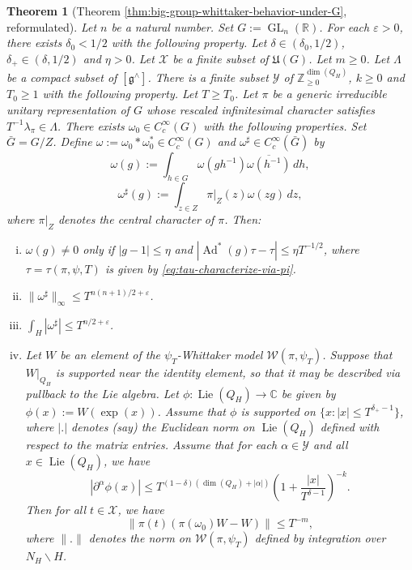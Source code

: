 \documentclass[reqno]{amsart}
\DeclareMathOperator{\GL}{GL}
\DeclareMathOperator{\Ad}{Ad}
\def\eps{\varepsilon}
\DeclareMathOperator{\Lie}{Lie}
\theoremstyle{plain} \newtheorem{theorem} {Theorem}
\theoremstyle{definition} \newtheorem{definition} [theorem] {Definition}
\theoremstyle{itplain} %
\numberwithin{equation}{section}
\numberwithin{theorem}{section}
\renewcommand{\geq}{\geqslant}
\renewcommand{\leq}{\leqslant}
\begin{document}
\begin{theorem}[Theorem \ref{thm:big-group-whittaker-behavior-under-G}, reformulated]
  Let $n$ be a natural number.  Set $G := \GL_n(\mathbb{R})$.  For each $\eps > 0$, there exists $\delta _0 < 1/2$ with the following property.  Let $\delta \in (\delta_0, 1/2)$, $\delta_+ \in (\delta, 1/2)$ and $\eta > 0$.  Let $\mathcal{X}$ be a finite subset of $\mathfrak{U}(G)$.  Let $m \geq 0$.  Let $\Lambda$ be a compact subset of $[\mathfrak{g}^\wedge]$.  There is a finite subset $\mathcal{Y}$ of $\mathbb{Z}_{\geq 0}^{\dim(Q_H)}$, $k \geq 0$ and $T_0 \geq 1$ with the following property.  Let $T \geq T_0$.  Let $\pi$ be a generic irreducible unitary representation of $G$ whose rescaled infinitesimal character satisfies $T^{-1} \lambda_\pi \in \Lambda$.  There exists $\omega_0 \in C_c^\infty(G)$ with the following properties.  Set $\bar{G} = G/Z$.  Define $\omega := \omega_0 \ast \omega_0^\ast \in C_c^\infty(G)$ and $\omega^\sharp \in C_c^\infty(\bar{G})$ by
  \begin{equation*}
    \omega(g) := \int _{h \in G} \omega(g h^{-1}) \overline{\omega(h^{-1})} \, d h,
  \end{equation*}
  \begin{equation*}
    \omega^\sharp (g) := \int _{z \in Z}
    \pi|_Z (z) \omega(z g) \, d z,
  \end{equation*}
  where $\pi|_Z$ denotes the central character of $\pi$.  Then:
  \begin{enumerate}[(i)]
  \item  $\omega(g) \neq 0$ only if $|g -1| \leq \eta$ and $|\Ad^*(g) \tau - \tau| \leq \eta T^{-1/2}$, where $\tau = \tau(\pi,\psi,T)$ is given by \eqref{eq:tau-characterize-via-pi}.
  \item $\|\omega^\sharp\|_{\infty} \leq T^{n(n+1)/2+\eps}$.
  \item $\int_H |\omega^\sharp| \leq T^{n/2 + \eps}$.
  \item Let $W$ be an element of the $\psi_T$-Whittaker model $\mathcal{W}(\pi,\psi_T)$.  Suppose that $W|_{Q_H}$ is supported near the identity element, so that it may be described via pullback to the Lie algebra.  Let $\phi : \Lie(Q_H) \rightarrow \mathbb{C}$ be given by $\phi(x) := W(\exp(x))$.  Assume that $\phi$ is supported on $\{x : |x| \leq T^{\delta_+ - 1}\}$, where $|.|$ denotes (say) the Euclidean norm on $\Lie(Q_H)$ defined with respect to the matrix entries.  Assume that for each $\alpha \in \mathcal{Y}$ and all $x \in \Lie(Q_H)$, we have
    \begin{equation*}
      \left\lvert \partial^\alpha \phi(x) \right\rvert \leq T^{(1 - \delta) (\dim(Q_H) + |\alpha|)} \left( 1 + \frac{|x|}{T^{\delta-1}} \right)^{-k}.
    \end{equation*}
    Then for all $t\in \mathcal{X}$, we have
    \begin{equation*}
      \|\pi(t) (\pi(\omega_0)W - W)\| \leq T^{-m},
    \end{equation*}
    where $\|.\|$ denotes the norm on $\mathcal{W}(\pi,\psi_T)$ defined by integration over $N_H \backslash H$.
  \end{enumerate}
\end{theorem}





\printindex


{} 
\end{document}
